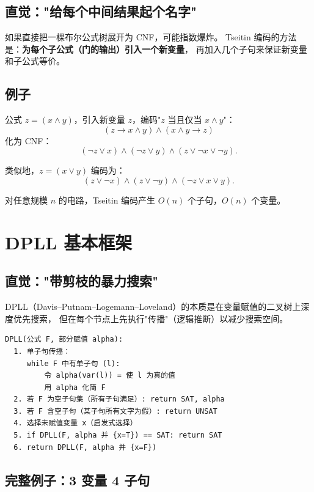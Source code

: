 \documentclass[UTF8,openany,12pt]{ctexbook}
\theoremstyle{remark}
\begin{document}
\subsection{直觉："给每个中间结果起个名字"}

如果直接把一棵布尔公式树展开为 CNF，可能指数爆炸。
Tseitin 编码的方法是：\textbf{为每个子公式（门的输出）引入一个新变量}，
再加入几个子句来保证新变量和子公式等价。

\subsection{例子}

公式 $z = (x \wedge y)$，引入新变量 $z$，编码"$z$ 当且仅当 $x \wedge y$"：
\[
  (z \to x \wedge y) \wedge (x \wedge y \to z)
\]
化为 CNF：
\[
  (\neg z \vee x) \wedge (\neg z \vee y) \wedge (z \vee \neg x \vee \neg y).
\]

类似地，$z = (x \vee y)$ 编码为：
\[
  (z \vee \neg x) \wedge (z \vee \neg y) \wedge (\neg z \vee x \vee y).
\]

对任意规模 $n$ 的电路，Tseitin 编码产生 $O(n)$ 个子句，$O(n)$ 个变量。

\section{DPLL 基本框架}

\subsection{直觉："带剪枝的暴力搜索"}

DPLL（Davis–Putnam–Logemann–Loveland）的本质是在变量赋值的二叉树上深度优先搜索，
但在每个节点上先执行"传播"（逻辑推断）以减少搜索空间。

\begin{lstlisting}[language={}]
DPLL(公式 F, 部分赋值 alpha):
  1. 单子句传播：
     while F 中有单子句 (l):
         令 alpha(var(l)) = 使 l 为真的值
         用 alpha 化简 F
  2. 若 F 为空子句集（所有子句满足）: return SAT, alpha
  3. 若 F 含空子句（某子句所有文字为假）: return UNSAT
  4. 选择未赋值变量 x（启发式选择）
  5. if DPLL(F, alpha 并 {x=T}) == SAT: return SAT
  6. return DPLL(F, alpha 并 {x=F})
\end{lstlisting}

\subsection{完整例子：3 变量 4 子句}
\end{document}
